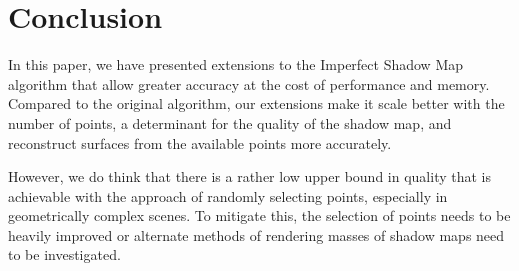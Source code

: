 \section{Conclusion}

In this paper, we have presented extensions to the Imperfect Shadow Map algorithm that allow greater accuracy at the cost of performance and memory. Compared to the original algorithm, our extensions make it scale better with the number of points, a determinant for the quality of the shadow map, and reconstruct surfaces from the available points more accurately.

However, we do think that there is a rather low upper bound in quality that is achievable with the approach of randomly selecting points, especially in geometrically complex scenes. To mitigate this, the selection of points needs to be heavily improved or alternate methods of rendering masses of shadow maps need to be investigated.
